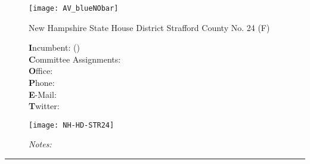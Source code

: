 \documentclass{article}
\begin{document}
\pagestyle{empty}

\begin{figure}[ht]
 \centering
 \begin{minipage}[t]{0.33\textwidth}
   \vspace{0pt}
   \centering
   \texttt{[image: AV\_blueNObar]}\\
   \begin{doublespace}
    {\LARGE New Hampshire State House District Strafford County No. 24 (F) } 
   \end{doublespace} 
   \raggedright
   {\textbf Incumbent:}   () \\
   {\textbf Committee Assignments:} \\
   {\textbf Office:}  \\
   {\textbf Phone:}  \\
   {\textbf E-Mail:}  \\
   {\textbf Twitter:}  \\
  \end{minipage}
  \begin{minipage}[t]{0.66\textwidth}
   \vspace{0pt}
   \centering
   \texttt{[image: NH-HD-STR24]}\\
   \raggedright
   \emph{Notes:}   \end{minipage}
\end{figure}

\hrule
\end{document}
